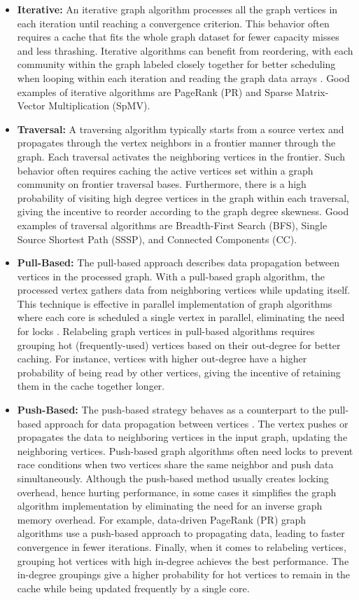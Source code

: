 \documentclass[sigconf, nonacm]{acmart}
\begin{document}
\begin{itemize}[topsep=2pt,itemsep=2pt,wide]
\item \textbf{Iterative:} An iterative graph algorithm processes all the graph vertices in each iteration until reaching a convergence criterion. This behavior often requires a cache that fits the whole graph dataset for fewer capacity misses and less thrashing. Iterative algorithms can benefit from reordering, with each community \cite{arai_rabbit_2016} within the graph labeled closely together for better scheduling when looping within each iteration and reading the graph data arrays \cite{mukkara_exploiting_2018}. Good examples of iterative algorithms are PageRank (PR) and Sparse Matrix-Vector Multiplication (SpMV).
\item \textbf{Traversal:} A traversing algorithm typically starts from a source vertex and propagates through the vertex neighbors in a frontier manner through the graph. Each traversal activates the neighboring vertices in the frontier. Such behavior often requires caching the active vertices set within a graph community on frontier traversal bases. Furthermore, there is a high probability of visiting high degree vertices in the graph within each traversal, giving the incentive to reorder according to the graph degree skewness. Good examples of traversal algorithms are Breadth-First Search (BFS), Single Source Shortest Path (SSSP), and Connected Components (CC).
\item \textbf{Pull-Based:} The pull-based approach describes data propagation between vertices in the processed graph. With a pull-based graph algorithm, the processed vertex gathers data from neighboring vertices while updating itself. This technique is effective in parallel implementation of graph algorithms where each core is scheduled a single vertex in parallel, eliminating the need for locks \cite{besta_push_2017}. Relabeling graph vertices in pull-based algorithms requires grouping hot (frequently-used) vertices based on their out-degree for better caching. For instance, vertices with higher out-degree have a higher probability of being read by other vertices, giving the incentive of retaining them in the cache together longer.
\item \textbf{Push-Based:} The push-based strategy behaves as a counterpart to the pull-based approach for data propagation between vertices \cite{besta_push_2017}. The vertex pushes or propagates the data to neighboring vertices in the input graph, updating the neighboring vertices. Push-based graph algorithms often need locks to prevent race conditions when two vertices share the same neighbor and push data simultaneously. Although the push-based method usually creates locking overhead, hence hurting performance, in some cases it simplifies the graph algorithm implementation by eliminating the need for an inverse graph memory overhead. For example, data-driven PageRank (PR) \cite{whang_scalable_2015} graph algorithms use a push-based approach to propagating data, leading to faster convergence in fewer iterations. Finally, when it comes to relabeling vertices, grouping hot vertices with high in-degree achieves the best performance. The in-degree groupings give a higher probability for hot vertices to remain in the cache while being updated frequently by a single core.

\end{itemize}
\end{document}
